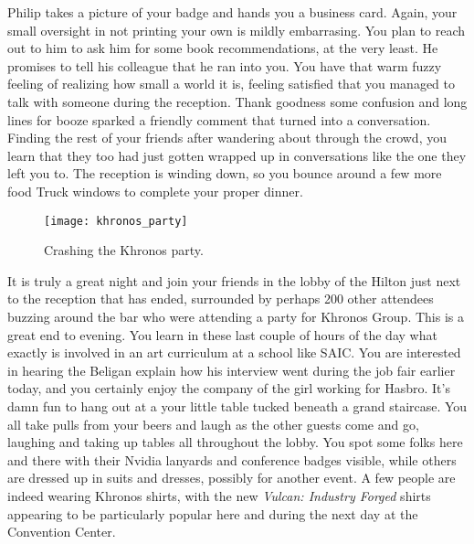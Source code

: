 \documentclass[../main.tex]{subfiles}
\begin{document}
Philip takes a picture of your badge and hands you a business card. Again, your small oversight in not printing your own is mildly embarrasing. You plan to reach out to him to ask him for some book recommendations, at the very least. He promises to tell his colleague that he ran into you. You have that warm fuzzy feeling of realizing how small a world it is, feeling satisfied that you managed to talk with someone during the reception. Thank goodness some confusion and long lines for booze sparked a friendly comment that turned into a conversation. Finding the rest of your friends after wandering about through the crowd, you learn that they too had just gotten wrapped up in conversations like the one they left you to. The reception is winding down, so you bounce around a few more food Truck windows to complete your proper dinner.

\begin{figure}[h!]
	\centering
	\texttt{[image: khronos\_party]}
	\caption*{Crashing the Khronos party.}
\end{figure}

It is truly a great night and join your friends in the lobby of the Hilton just next to the reception that has ended, surrounded by perhaps 200 other attendees buzzing around the bar who were attending a party for Khronos Group. This is a great end to evening. You learn in these last couple of hours of the day what exactly is involved in an art curriculum at a school like SAIC. You are interested in hearing the Beligan explain how his interview went during the job fair earlier today, and you certainly enjoy the company of the girl working for Hasbro. It's damn fun to hang out at a your little table tucked beneath a grand staircase. You all take pulls from your beers and laugh as the other guests come and go, laughing and taking up tables all throughout the lobby. You spot some folks here and there with their Nvidia lanyards and conference badges visible, while others are dressed up in suits and dresses, possibly for another event. A few people are indeed wearing Khronos shirts, with the new \textit{Vulcan: Industry Forged} shirts appearing to be particularly popular here and during the next day at the Convention Center. 
\end{document}
